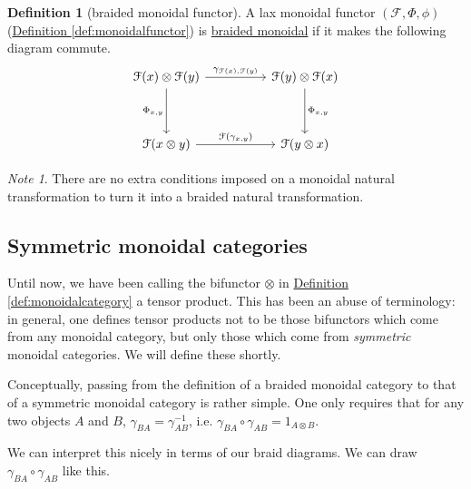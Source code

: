 \documentclass[a4paper]{report}
\newcommand{\defn}[1]{\ul{#1}}
\theoremstyle{definition}
\newtheorem{definition}{Definition}[section]
\theoremstyle{plain}
\theoremstyle{remark}
\newtheorem{note}{Note}[section]
\begin{document}
\begin{definition}[braided monoidal functor]
  \label{def:braidedmonoidalfunctor}
  A lax monoidal functor $(\mathcal{F}, \Phi, \phi)$ (\hyperref[def:monoidalfunctor]{Definition \ref*{def:monoidalfunctor}}) is \defn{braided monoidal} if it makes the following diagram commute.
  \begin{equation*}
    \begin{tikzcd}[row sep=huge, column sep=huge]
      \mathcal{F}(x) \otimes \mathcal{F}(y)
      \arrow[r, "{\gamma_{\mathcal{F}(x), \mathcal{F}(y)}}"]
      \arrow[d, swap, "{\Phi_{x,  y}}"]
      & \mathcal{F}(y) \otimes \mathcal{F}(x)
      \arrow[d, "{\Phi_{x, y}}"]
      \\
      \mathcal{F}(x \otimes y)
      \arrow[r, "{\mathcal{F}(\gamma_{x, y})}"]
      & \mathcal{F}(y \otimes x)
    \end{tikzcd}
  \end{equation*}
  \begin{note}
    There are no extra conditions imposed on a monoidal natural transformation to turn it into a braided natural transformation. 
  \end{note}
\end{definition}

\subsection{Symmetric monoidal categories}
Until now, we have been calling the bifunctor $\otimes$ in \hyperref[def:monoidalcategory]{Definition \ref*{def:monoidalcategory}} a tensor product. This has been an abuse of terminology: in general, one defines tensor products not to be those bifunctors which come from any monoidal category, but only those which come from \emph{symmetric} monoidal categories. We will define these shortly.

Conceptually, passing from the definition of a braided monoidal category to that of a symmetric monoidal category is rather simple. One only requires that for any two objects $A$ and $B$, $\gamma_{BA} = \gamma_{AB}^{-1}$, i.e. $\gamma_{BA} \circ \gamma_{AB} = 1_{A \otimes B}$.

We can interpret this nicely in terms of our braid diagrams. We can draw $\gamma_{BA} \circ \gamma_{AB}$ like this.

\begin{center}
\end{center}
\end{document}
